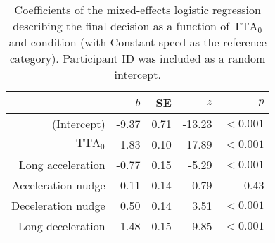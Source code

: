 \begin{table}[h]
\centering
\caption{Coefficients of the mixed-effects logistic regression describing the final decision as a function of $\textrm{TTA}_0$ and condition (with Constant speed as the reference category). Participant ID was included as a random intercept.}
\label{tab:decision}
\begin{tabular}{rrrrr}
\toprule
 & $b$ & SE & $z$ & $p$ \\
\midrule
(Intercept) & -9.37 & 0.71 & -13.23 & $<0.001$ \\
$\textrm{TTA}_0$ & 1.83 & 0.10 & 17.89 & $<0.001$ \\
Long acceleration & -0.77 & 0.15 & -5.29 & $<0.001$ \\
Acceleration nudge & -0.11 & 0.14 & -0.79 & 0.43 \\
Deceleration nudge & 0.50 & 0.14 & 3.51 & $<0.001$ \\
Long deceleration & 1.48 & 0.15 & 9.85 & $<0.001$ \\
\bottomrule
\end{tabular}
\end{table}
